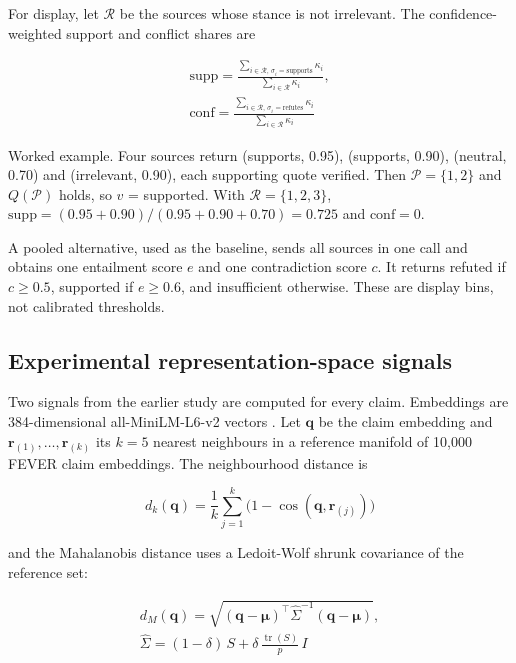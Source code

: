 \documentclass[conference]{IEEEtran}
\begin{document}
For display, let $\mathcal{R}$ be the sources whose stance is not irrelevant. The confidence-weighted support and conflict shares are

\begin{equation}
\begin{aligned}
\mathrm{supp} = \frac{\sum_{i \in \mathcal{R},\, \sigma_i = \text{supports}} \kappa_i}{\sum_{i \in \mathcal{R}} \kappa_i}, \\
\mathrm{conf} = \frac{\sum_{i \in \mathcal{R},\, \sigma_i = \text{refutes}} \kappa_i}{\sum_{i \in \mathcal{R}} \kappa_i}
\end{aligned}
\end{equation}

Worked example. Four sources return (supports, 0.95), (supports, 0.90), (neutral, 0.70) and (irrelevant, 0.90), each supporting quote verified. Then $\mathcal{P}=\{1,2\}$ and $Q(\mathcal{P})$ holds, so $v$ = supported. With $\mathcal{R}=\{1,2,3\}$, $\mathrm{supp} = (0.95+0.90)/(0.95+0.90+0.70) = 0.725$ and $\mathrm{conf}=0$.

A pooled alternative, used as the baseline, sends all sources in one call and obtains one entailment score $e$ and one contradiction score $c$. It returns refuted if $c \ge 0.5$, supported if $e \ge 0.6$, and insufficient otherwise. These are display bins, not calibrated thresholds.

\subsection{Experimental representation-space signals}

Two signals from the earlier study are computed for every claim. Embeddings are 384-dimensional all-MiniLM-L6-v2 vectors \cite{reimers2019,wang2020}. Let $\mathbf{q}$ be the claim embedding and $\mathbf{r}_{(1)},\dots,\mathbf{r}_{(k)}$ its $k=5$ nearest neighbours in a reference manifold of 10,000 FEVER claim embeddings. The neighbourhood distance is

\begin{equation}
d_k(\mathbf{q}) = \frac{1}{k}\sum_{j=1}^{k}\bigl(1-\cos(\mathbf{q},\mathbf{r}_{(j)})\bigr)
\end{equation}

and the Mahalanobis distance uses a Ledoit-Wolf shrunk covariance of the reference set:

\begin{equation}
\begin{aligned}
d_M(\mathbf{q}) = \sqrt{(\mathbf{q}-\boldsymbol{\mu})^{\top}\hat{\Sigma}^{-1}(\mathbf{q}-\boldsymbol{\mu})}, \\
\hat{\Sigma} = (1-\delta)\,S + \delta\,\frac{\operatorname{tr}(S)}{p}\,I
\end{aligned}
\end{equation}
\end{document}
